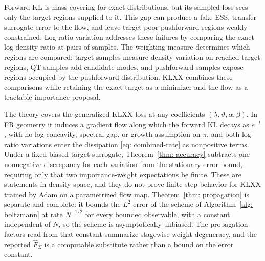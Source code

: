 \documentclass{article}
\begin{document}
Forward KL is mass-covering for exact distributions, but its sampled loss sees only the target regions supplied to it. This gap can produce a fake ESS, transfer surrogate error to the flow, and leave target-poor pushforward regions weakly constrained. Log-ratio variation addresses these failures by comparing the exact log-density ratio at pairs of samples. The weighting measure determines which regions are compared: target samples measure density variation on reached target regions, QT samples add candidate modes, and pushforward samples expose regions occupied by the pushforward distribution. KLXX combines these comparisons while retaining the exact target as a minimizer and the flow as a tractable importance proposal.

The theory covers the generalized KLXX loss at any coefficients $(\lambda,\vartheta,\alpha,\beta)$. In FR geometry it induces a gradient flow along which the forward KL decays as $e^{-t}$, with no log-concavity, spectral gap, or growth assumption on $\pi$, and both log-ratio variations enter the dissipation \eqref{eq: combined-rate} as nonpositive terms. Under a fixed biased target surrogate, Theorem~\ref{thm: accuracy} subtracts one nonnegative discrepancy for each variation from the stationary error bound, requiring only that two importance-weight expectations be finite. These are statements in density space, and they do not prove finite-step behavior for KLXX trained by Adam on a parametrized flow map. Theorem~\ref{thm: propagation} is separate and complete: it bounds the $L^2$ error of {\color{purple}the scheme of Algorithm~\ref{alg: boltzmann}} at rate $N^{-1/2}$ for every bounded observable, with a constant independent of $N$, so the scheme is asymptotically unbiased. The propagation factors read from that constant summarize stagewise weight degeneracy, and the reported $\hat F_\Sigma$ is a computable substitute rather than a bound on the error constant.
\end{document}
